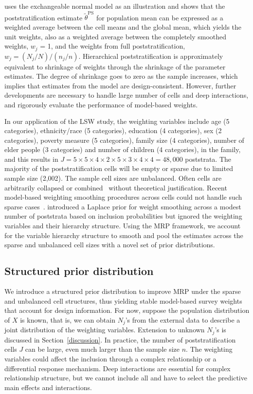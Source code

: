 \documentclass[11pt]{article}
\numberwithin{figure}{section}
\numberwithin{table}{section}
\numberwithin{equation}{section}
\begin{document}
\cite{gelman07} uses the exchangeable normal model as an illustration and shows
that the poststratification estimate $\tilde{\theta}^{\textrm{PS}}$ for
population mean can be expressed as a weighted average between the cell means
and the global mean, which yields the unit weights, also as a weighted average
between the completely smoothed weights, $w_j$ = 1, and the weights from full
poststratification, $w_j = (N_j/N)/(n_j /n)$. Hierarchical poststratification
is approximately equivalent to shrinkage of weights through the shrinkage of
the parameter estimates. The degree of shrinkage goes to zero as the sample
increases, which implies that estimates from the model are design-consistent.
However, further developments are necessary to handle large number of cells and
deep interactions, and rigorously evaluate the performance of model-based
weights. 

In our application of the LSW study, the weighting variables include age (5
categories), ethnicity/race (5 categories), education (4 categories), sex (2
categories), poverty measure (5 categories), family size (4 categories), number
of elder people (3 categories) and number of children (4 categories), in the
family, and this results in
$J=5\times5\times4\times2\times5\times3\times4\times4=48,\!000$ poststrata. The
majority of the poststratification cells will be empty or sparse due to limited
sample size (2,002). The sample cell sizes are unbalanced. Often cells are
arbitrarily collapsed or combined~\citep{little93} without theoretical
justification. Recent model-based weighting smoothing procedures across cells
could not handle such sparse cases~\citep{modeltrim-elliottandlittle00}.
\cite{elliot:JOS16} introduced a Laplace prior for weight smoothing across a
modest number of poststrata based on inclusion probabilities but ignored the
weighting variables and their hierarchy structure. Using the MRP framework, we
account for the variable hierarchy structure to smooth and pool the estimates
across the sparse and unbalanced cell sizes with a novel set of prior
distributions.

\subsection{Structured prior distribution}

We introduce a structured prior distribution to improve MRP under the sparse
and unbalanced cell structures, thus yielding stable model-based survey weights
that account for design information. For now, suppose the population
distribution of $X$ is known, that is, we can obtain $N_j$'s from the external
data to describe a joint distribution of the weighting variables. Extension to
unknown $N_j$'s is discussed in Section~\ref{discussion}. In practice, the
number of poststratification cells $J$ can be large, even much larger than the
sample size $n$. The weighting variables could affect the inclusion through a
complex relationship or a differential response mechanism. Deep interactions
are essential for complex relationship structure, but we cannot include all and
have to select the predictive main effects and interactions. 
\end{document}
